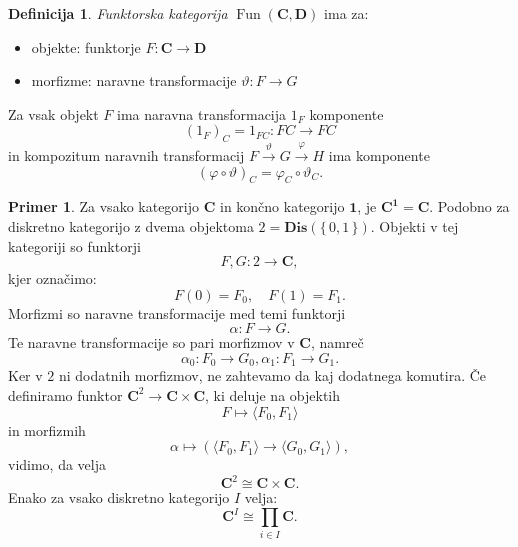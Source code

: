 \documentclass[12pt,a4paper]{book}
\theoremstyle{definition}
\newtheorem{definicija}{Definicija}[chapter]
\theoremstyle{plain}
\theoremstyle{definition}
\newtheorem{primer}{Primer}[section]
\theoremstyle{remark}
\newcommand{\cat}[1]{\textbf{#1}}
\DeclareMathOperator{\Fun}{Fun}
\renewcommand{\set}[1]{\{\,#1\,\}}
\newcommand{\fprod}[1]{\langle #1 \rangle}
\begin{document}
\begin{definicija}
\emph{Funktorska kategorija} $\Fun(\cat{C}, \cat{D})$ ima za:
\begin{itemize}
\item objekte: funktorje $F : \cat{C} \to \cat{D}$
\item morfizme: naravne transformacije $\vartheta : F \to G$
\end{itemize}
Za vsak objekt $F$ ima naravna transformacija $1_F$ komponente
$$ (1_F)_C = 1_{FC} : FC \to FC$$
in kompozitum naravnih transformacij $F \xrightarrow{\vartheta} G \xrightarrow{\varphi} H$
ima komponente
$$ (\varphi \circ \vartheta)_C = \varphi_C \circ \vartheta_C.$$
\end{definicija}

\begin{primer}
Za vsako kategorijo $\cat{C}$ in končno kategorijo $\cat{1}$, je $\cat{C}^\cat{1} = \cat{C}$. Podobno za diskretno kategorijo z dvema objektoma $2 = \cat{Dis}(\set{0,1})$.
Objekti v tej kategoriji so funktorji
$$F,G : 2 \to \cat{C},$$
kjer označimo:
$$F(0) = F_0, \quad F(1) = F_1.$$
Morfizmi so naravne transformacije med temi funktorji
$$\alpha: F \to G.$$
Te naravne transformacije so pari morfizmov v $\cat{C}$, namreč
$$\alpha_0 : F_0 \to G_0, \alpha_1 : F_1 \to G_1.$$
Ker v $2$ ni dodatnih morfizmov, ne zahtevamo da kaj dodatnega komutira.
Če definiramo funktor $\cat{C}^2 \to \cat{C} \times \cat{C}$, ki deluje na objektih
$$F \mapsto \fprod{F_0,F_1}$$
in morfizmih
$$\alpha \mapsto (\fprod{F_0,F_1} \to \fprod{G_0,G_1}),$$
vidimo, da velja
$$\cat{C}^2 \cong \cat{C} \times \cat{C}.$$
Enako za vsako diskretno kategorijo $I$ velja:
$$\cat{C}^I \cong \prod_{i \in I}\cat{C}.$$

\end{primer}
\end{document}
